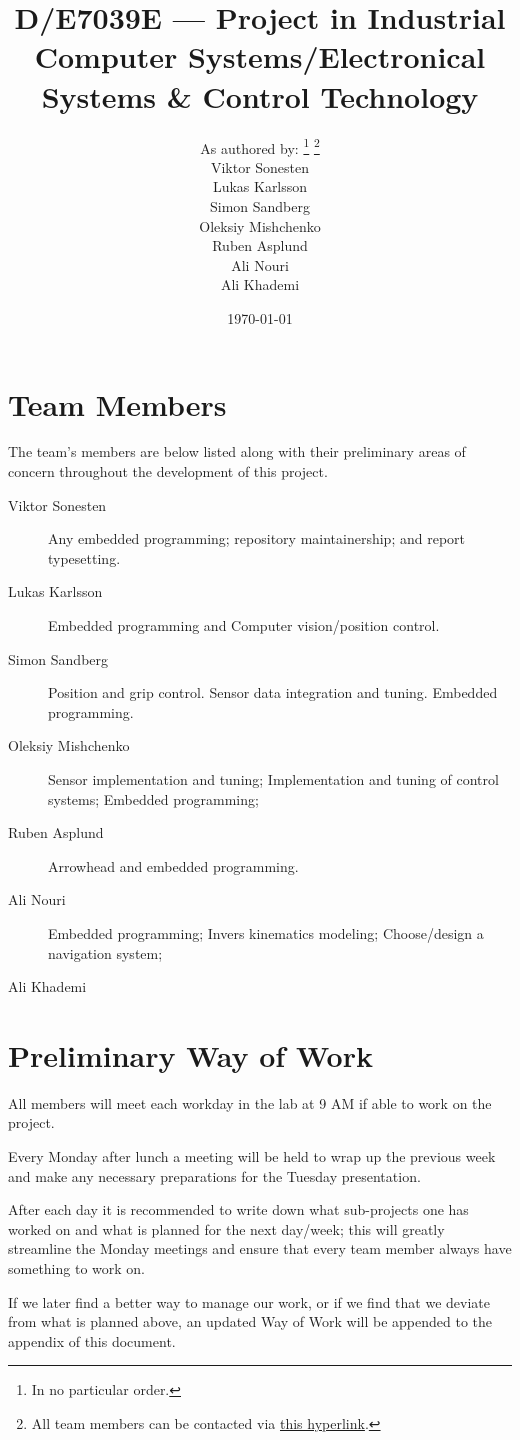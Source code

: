 \documentclass[twocolumn]{article}
\title{D/E7039E --- Project in Industrial Computer Systems/Electronical Systems \& Control Technology}
\author{
As authored by:
\footnote{In no particular order.}
\footnote{All team members can be contacted via
\href{mailto:vikson-6@student.ltu.se;lukkar-4@student.ltu.se;simpen-1@student.ltu.se;olemis-6@student.ltu.se;rubasp-6@student.ltu.se;alinou-6@student.ltu.se;alikhar-6@student.ltu.se}{this hyperlink}.} \\
Viktor Sonesten \hypermail{vikson-6@student.ltu.se} \\
Lukas Karlsson \hypermail{lukkar-4@student.ltu.se} \\
Simon Sandberg \hypermail{simpen-1@student.ltu.se} \\
Oleksiy Mishchenko \hypermail{olemis-6@student.ltu.se} \\
Ruben Asplund \hypermail{rubasp-6@student.ltu.se} \\
Ali Nouri \hypermail{alinou-6@student.ltu.se} \\
Ali Khademi \hypermail{alikha-6@student.ltu.se}
}
\date{\today}
\begin{document}
\maketitle

\appendix
\section{Team Members}
The team's members are below listed along with their preliminary areas of concern throughout the development of this project.

\begin{description}
    \item[Viktor Sonesten]
    Any embedded programming;
    repository maintainership; and
    report typesetting.

    \item[Lukas Karlsson]
    Embedded programming and
    Computer vision/position control.
    \item[Simon Sandberg]
    Position and grip control.
    Sensor data integration and tuning.
    Embedded programming.
    \item[Oleksiy Mishchenko]
    Sensor implementation and tuning;
    Implementation and tuning of control systems;
    Embedded programming;
    \item[Ruben Asplund]
    Arrowhead and embedded programming.
    \item[Ali Nouri]
    Embedded programming;
    Invers kinematics modeling;
    Choose/design a navigation system;
    \item[Ali Khademi]
\end{description}

\section{Preliminary Way of Work}
All members will meet each workday in the lab at 9 AM if able to work on the project.

Every Monday after lunch a meeting will be held to wrap up the previous week and make any necessary preparations for the Tuesday presentation.

After each day it is recommended to write down what sub-projects one has worked on and what is planned for the next day/week;
this will greatly streamline the Monday meetings and ensure that every team member always have something to work on.

If we later find a better way to manage our work,
or if we find that we deviate from what is planned above,
an updated Way of Work will be appended to the appendix of this document.
\end{document}
